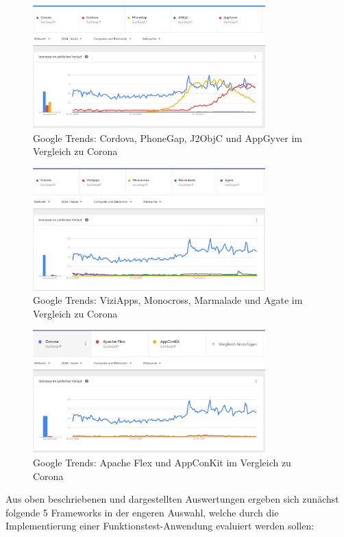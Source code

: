 \begin{figure}[h]
	\centering
	\includegraphics[width=0.8\textwidth]{Bilder/trends_3.PNG}
	\caption{Google Trends: Cordova, PhoneGap, J2ObjC und AppGyver im Vergleich zu Corona}
	\label{fig:Trends3}
\end{figure}
\begin{figure}[h]
	\centering
	\includegraphics[width=0.8\textwidth]{Bilder/trends_4.PNG}
	\caption{Google Trends: ViziApps, Monocross, Marmalade und Agate im Vergleich zu Corona}
	\label{fig:Trends4}
\end{figure}
\begin{figure}[h]
	\centering
	\includegraphics[width=0.8\textwidth]{Bilder/trends_5.PNG}
	\caption{Google Trends: Apache Flex und AppConKit im Vergleich zu Corona}
	\label{fig:Trends5}
\end{figure}
\clearpage
Aus oben beschriebenen und dargestellten Auswertungen ergeben sich zunächst folgende 5 Frameworks in der engeren Auswahl, welche durch die Implementierung einer Funktionstest-Anwendung evaluiert werden sollen:

